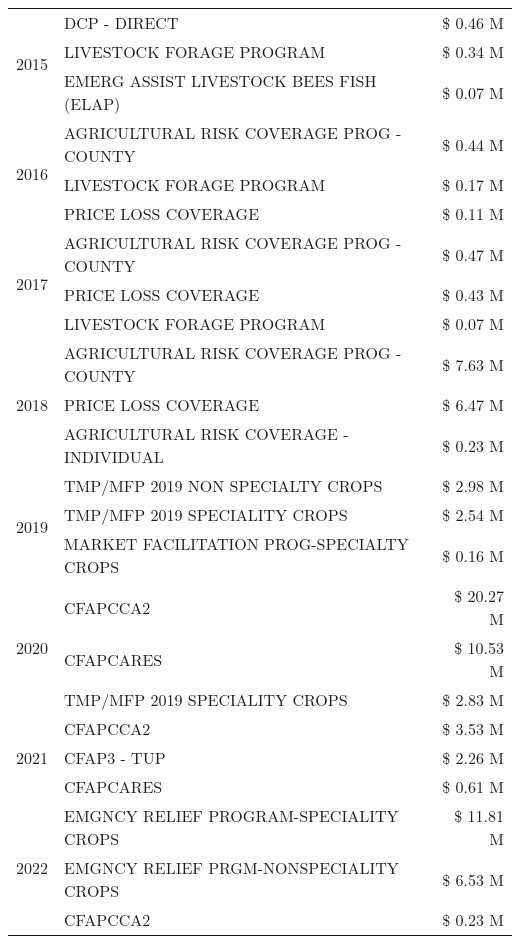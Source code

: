 \begin{tabular}{llr}
\cline{1-3}
\multirow[t]{3}{*}{2015} & DCP - DIRECT & \$ 0.46 M \\
 & LIVESTOCK FORAGE PROGRAM & \$ 0.34 M \\
 & EMERG ASSIST LIVESTOCK BEES FISH (ELAP) & \$ 0.07 M \\
\cline{1-3}
\multirow[t]{3}{*}{2016} & AGRICULTURAL RISK COVERAGE PROG - COUNTY & \$ 0.44 M \\
 & LIVESTOCK FORAGE PROGRAM & \$ 0.17 M \\
 & PRICE LOSS COVERAGE & \$ 0.11 M \\
\cline{1-3}
\multirow[t]{3}{*}{2017} & AGRICULTURAL RISK COVERAGE PROG - COUNTY & \$ 0.47 M \\
 & PRICE LOSS COVERAGE & \$ 0.43 M \\
 & LIVESTOCK FORAGE PROGRAM & \$ 0.07 M \\
\cline{1-3}
\multirow[t]{3}{*}{2018} & AGRICULTURAL RISK COVERAGE PROG - COUNTY & \$ 7.63 M \\
 & PRICE LOSS COVERAGE & \$ 6.47 M \\
 & AGRICULTURAL RISK COVERAGE - INDIVIDUAL & \$ 0.23 M \\
\cline{1-3}
\multirow[t]{3}{*}{2019} & TMP/MFP 2019 NON SPECIALTY CROPS & \$ 2.98 M \\
 & TMP/MFP 2019 SPECIALITY CROPS & \$ 2.54 M \\
 & MARKET FACILITATION PROG-SPECIALTY CROPS & \$ 0.16 M \\
\cline{1-3}
\multirow[t]{3}{*}{2020} & CFAPCCA2 & \$ 20.27 M \\
 & CFAPCARES & \$ 10.53 M \\
 & TMP/MFP 2019 SPECIALITY CROPS & \$ 2.83 M \\
\cline{1-3}
\multirow[t]{3}{*}{2021} & CFAPCCA2 & \$ 3.53 M \\
 & CFAP3 - TUP & \$ 2.26 M \\
 & CFAPCARES & \$ 0.61 M \\
\cline{1-3}
\multirow[t]{3}{*}{2022} & EMGNCY RELIEF PROGRAM-SPECIALITY CROPS & \$ 11.81 M \\
 & EMGNCY RELIEF PRGM-NONSPECIALITY CROPS & \$ 6.53 M \\
 & CFAPCCA2 & \$ 0.23 M \\
\cline{1-3}
\bottomrule
\end{tabular}
